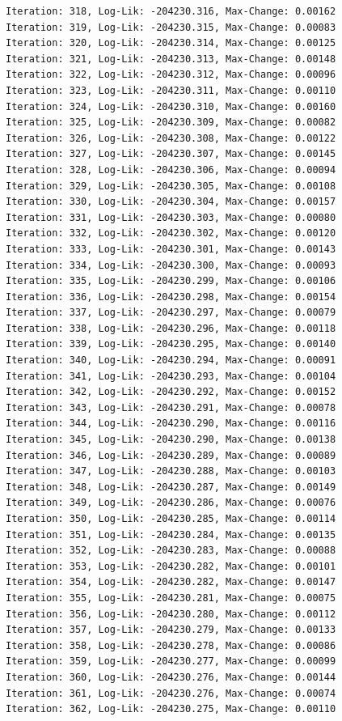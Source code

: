 \documentclass[
  letterpaper,
  DIV=11,
  numbers=noendperiod]{scrreport}
\begin{document}
\begin{verbatim}
Iteration: 318, Log-Lik: -204230.316, Max-Change: 0.00162
Iteration: 319, Log-Lik: -204230.315, Max-Change: 0.00083
Iteration: 320, Log-Lik: -204230.314, Max-Change: 0.00125
Iteration: 321, Log-Lik: -204230.313, Max-Change: 0.00148
Iteration: 322, Log-Lik: -204230.312, Max-Change: 0.00096
Iteration: 323, Log-Lik: -204230.311, Max-Change: 0.00110
Iteration: 324, Log-Lik: -204230.310, Max-Change: 0.00160
Iteration: 325, Log-Lik: -204230.309, Max-Change: 0.00082
Iteration: 326, Log-Lik: -204230.308, Max-Change: 0.00122
Iteration: 327, Log-Lik: -204230.307, Max-Change: 0.00145
Iteration: 328, Log-Lik: -204230.306, Max-Change: 0.00094
Iteration: 329, Log-Lik: -204230.305, Max-Change: 0.00108
Iteration: 330, Log-Lik: -204230.304, Max-Change: 0.00157
Iteration: 331, Log-Lik: -204230.303, Max-Change: 0.00080
Iteration: 332, Log-Lik: -204230.302, Max-Change: 0.00120
Iteration: 333, Log-Lik: -204230.301, Max-Change: 0.00143
Iteration: 334, Log-Lik: -204230.300, Max-Change: 0.00093
Iteration: 335, Log-Lik: -204230.299, Max-Change: 0.00106
Iteration: 336, Log-Lik: -204230.298, Max-Change: 0.00154
Iteration: 337, Log-Lik: -204230.297, Max-Change: 0.00079
Iteration: 338, Log-Lik: -204230.296, Max-Change: 0.00118
Iteration: 339, Log-Lik: -204230.295, Max-Change: 0.00140
Iteration: 340, Log-Lik: -204230.294, Max-Change: 0.00091
Iteration: 341, Log-Lik: -204230.293, Max-Change: 0.00104
Iteration: 342, Log-Lik: -204230.292, Max-Change: 0.00152
Iteration: 343, Log-Lik: -204230.291, Max-Change: 0.00078
Iteration: 344, Log-Lik: -204230.290, Max-Change: 0.00116
Iteration: 345, Log-Lik: -204230.290, Max-Change: 0.00138
Iteration: 346, Log-Lik: -204230.289, Max-Change: 0.00089
Iteration: 347, Log-Lik: -204230.288, Max-Change: 0.00103
Iteration: 348, Log-Lik: -204230.287, Max-Change: 0.00149
Iteration: 349, Log-Lik: -204230.286, Max-Change: 0.00076
Iteration: 350, Log-Lik: -204230.285, Max-Change: 0.00114
Iteration: 351, Log-Lik: -204230.284, Max-Change: 0.00135
Iteration: 352, Log-Lik: -204230.283, Max-Change: 0.00088
Iteration: 353, Log-Lik: -204230.282, Max-Change: 0.00101
Iteration: 354, Log-Lik: -204230.282, Max-Change: 0.00147
Iteration: 355, Log-Lik: -204230.281, Max-Change: 0.00075
Iteration: 356, Log-Lik: -204230.280, Max-Change: 0.00112
Iteration: 357, Log-Lik: -204230.279, Max-Change: 0.00133
Iteration: 358, Log-Lik: -204230.278, Max-Change: 0.00086
Iteration: 359, Log-Lik: -204230.277, Max-Change: 0.00099
Iteration: 360, Log-Lik: -204230.276, Max-Change: 0.00144
Iteration: 361, Log-Lik: -204230.276, Max-Change: 0.00074
Iteration: 362, Log-Lik: -204230.275, Max-Change: 0.00110

\end{verbatim}
\end{document}
